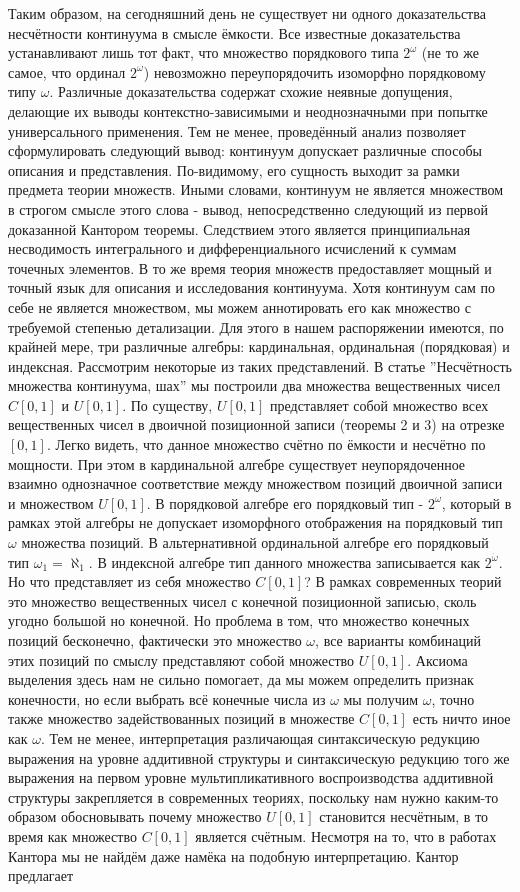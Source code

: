\documentclass[12pt]{article}
\begin{document}
Таким образом, на сегодняшний день не существует ни одного доказательства несчётности континуума в смысле ёмкости. Все известные доказательства устанавливают лишь тот факт, что множество порядкового типа $2^{\omega}$ (не то же самое, что ординал $2^{\omega}$) невозможно переупорядочить изоморфно порядковому типу $\omega$. Различные доказательства содержат схожие неявные допущения, делающие их выводы контекстно-зависимыми и неоднозначными при попытке универсального применения. Тем не менее, проведённый анализ позволяет сформулировать следующий вывод: континуум допускает различные способы описания и представления. По-видимому, его сущность выходит за рамки предмета теории множеств. Иными словами, континуум не является множеством в строгом смысле этого слова - вывод, непосредственно следующий из первой доказанной Кантором теоремы. Следствием этого является принципиальная несводимость интегрального и дифференциального исчислений к суммам точечных элементов. В то же время теория множеств предоставляет мощный и точный язык для описания и исследования континуума. Хотя континуум сам по себе не является множеством, мы можем аннотировать его как множество с требуемой степенью детализации. Для этого в нашем распоряжении имеются, по крайней мере, три различные алгебры: кардинальная, ординальная (порядковая) и индексная. Рассмотрим некоторые из таких представлений. В статье ''Несчётность множества континуума, шах'' мы построили два множества вещественных чисел $C[0, 1]$ и $U[0, 1]$. По существу, $U[0, 1]$ представляет собой множество всех вещественных чисел в двоичной позиционной записи (теоремы 2 и 3) на отрезке $[0, 1]$. Легко видеть, что данное множество счётно по ёмкости и несчётно по мощности. При этом в кардинальной алгебре существует неупорядоченное взаимно однозначное соответствие между множеством позиций двоичной записи и множеством $U[0, 1]$. В порядковой алгебре его порядковый тип - $2^{\omega}$, который в рамках этой алгебры не допускает изоморфного отображения на порядковый тип $\omega$ множества позиций. В альтернативной ординальной алгебре его порядковый тип $\omega_1 = \aleph_1$. В индексной алгебре тип данного множества записывается как $2^{\dot{\omega}}$. Но что представляет из себя множество $C[0, 1]$? В рамках современных теорий это множество вещественных чисел с конечной позиционной записью, сколь угодно большой но конечной. Но проблема в том, что множество конечных позиций бесконечно, фактически это множество $\omega$, все варианты комбинаций этих позиций по смыслу представляют собой множество $U[0, 1]$. Аксиома выделения здесь нам не сильно помогает, да мы можем определить признак конечности, но если выбрать всё конечные числа из $\omega$ мы получим $\omega$, точно также множество задействованных позиций в множестве $C[0, 1]$ есть ничто иное как $\omega$. Тем не менее, интерпретация различающая синтаксическую редукцию выражения на уровне аддитивной структуры и синтаксическую редукцию того же выражения на первом уровне мультипликативного воспроизводства аддитивной структуры закрепляется в современных теориях, поскольку нам нужно каким-то образом обосновывать почему множество $U[0, 1]$ становится несчётным, в то время как множество $C[0, 1]$ является счётным. Несмотря на то, что в работах Кантора мы не найдём даже намёка на подобную интерпретацию. Кантор предлагает 
\end{document}
